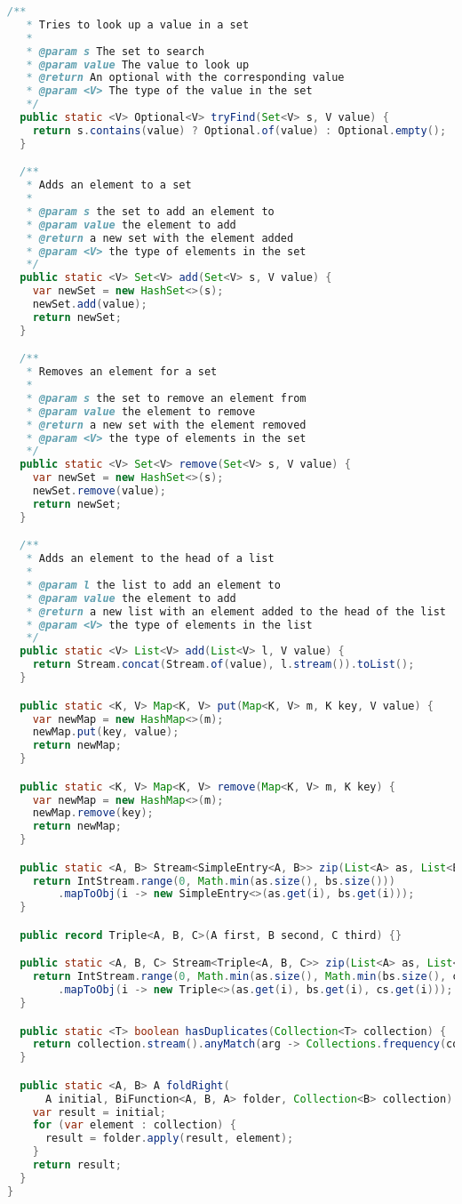 \begin{lstlisting}[language=Java]
  /**
   * Tries to look up a value in a set
   *
   * @param s The set to search
   * @param value The value to look up
   * @return An optional with the corresponding value
   * @param <V> The type of the value in the set
   */
  public static <V> Optional<V> tryFind(Set<V> s, V value) {
    return s.contains(value) ? Optional.of(value) : Optional.empty();
  }

  /**
   * Adds an element to a set
   *
   * @param s the set to add an element to
   * @param value the element to add
   * @return a new set with the element added
   * @param <V> the type of elements in the set
   */
  public static <V> Set<V> add(Set<V> s, V value) {
    var newSet = new HashSet<>(s);
    newSet.add(value);
    return newSet;
  }

  /**
   * Removes an element for a set
   *
   * @param s the set to remove an element from
   * @param value the element to remove
   * @return a new set with the element removed
   * @param <V> the type of elements in the set
   */
  public static <V> Set<V> remove(Set<V> s, V value) {
    var newSet = new HashSet<>(s);
    newSet.remove(value);
    return newSet;
  }

  /**
   * Adds an element to the head of a list
   *
   * @param l the list to add an element to
   * @param value the element to add
   * @return a new list with an element added to the head of the list
   * @param <V> the type of elements in the list
   */
  public static <V> List<V> add(List<V> l, V value) {
    return Stream.concat(Stream.of(value), l.stream()).toList();
  }

  public static <K, V> Map<K, V> put(Map<K, V> m, K key, V value) {
    var newMap = new HashMap<>(m);
    newMap.put(key, value);
    return newMap;
  }

  public static <K, V> Map<K, V> remove(Map<K, V> m, K key) {
    var newMap = new HashMap<>(m);
    newMap.remove(key);
    return newMap;
  }

  public static <A, B> Stream<SimpleEntry<A, B>> zip(List<A> as, List<B> bs) {
    return IntStream.range(0, Math.min(as.size(), bs.size()))
        .mapToObj(i -> new SimpleEntry<>(as.get(i), bs.get(i)));
  }

  public record Triple<A, B, C>(A first, B second, C third) {}

  public static <A, B, C> Stream<Triple<A, B, C>> zip(List<A> as, List<B> bs, List<C> cs) {
    return IntStream.range(0, Math.min(as.size(), Math.min(bs.size(), cs.size())))
        .mapToObj(i -> new Triple<>(as.get(i), bs.get(i), cs.get(i)));
  }

  public static <T> boolean hasDuplicates(Collection<T> collection) {
    return collection.stream().anyMatch(arg -> Collections.frequency(collection, arg) > 1);
  }

  public static <A, B> A foldRight(
      A initial, BiFunction<A, B, A> folder, Collection<B> collection) {
    var result = initial;
    for (var element : collection) {
      result = folder.apply(result, element);
    }
    return result;
  }
}

\end{lstlisting}